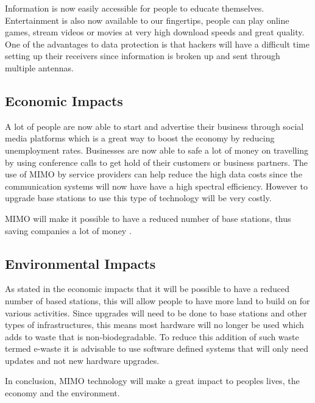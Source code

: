 \documentclass[pdftex,11pt,a4paper]{article}
\begin{document}
\begin{appendices}
	Information is now easily accessible for people to educate themselves. Entertainment is also now available to our fingertips, people can play online games, stream videos or movies at very high download speeds and great quality. One of the advantages to data protection is that hackers will have a difficult time setting up their receivers since information is broken up and sent through multiple antennas.
	
	\subsection{Economic Impacts}
	A lot of people are now able to start and advertise their business through social media platforms which is a great way to boost the economy by reducing unemployment rates. Businesses are now able to safe a lot of money on travelling by using conference calls to get hold of their customers or business partners. The use of MIMO by service providers can help reduce the high data costs since the communication systems will now have have a high spectral efficiency. However to upgrade base stations to use this type of technology will be very costly.
	
	MIMO will make it possible to have a reduced number of base stations, thus saving companies a lot of money \cite{50}.
	\subsection{Environmental Impacts}
	As stated in the economic impacts that it will be possible to have a reduced number of based stations, this will allow people to have more land to build on for various activities. Since upgrades will need to be done to base stations and other types of infrastructures, this means most hardware will no longer be used which adds to waste that is non-biodegradable. To reduce this addition of such waste termed e-waste it is advisable to use software defined systems that will only need updates and not new hardware upgrades.
	
	In conclusion, MIMO technology will make a great impact to peoples lives, the economy and the environment.
	
\end{appendices}
\end{document}
